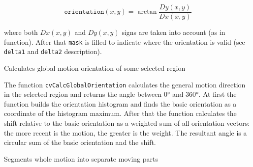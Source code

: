 \[
\texttt{orientation}(x,y)=\arctan{\frac{Dy(x,y)}{Dx(x,y)}}
\]

where both $Dx(x,y)$ and $Dy(x,y)$ signs are taken into account (as in  function). After that \texttt{mask} is filled to indicate where the orientation is valid (see \texttt{delta1} and \texttt{delta2} description).

\label{CalcGlobalOrientation}

Calculates global motion orientation of some selected region


\begin{description}
\end{description}

The function \texttt{cvCalcGlobalOrientation} calculates the general
motion direction in the selected region and returns the angle between
0° and 360°. At first the function builds the orientation histogram
and finds the basic orientation as a coordinate of the histogram
maximum. After that the function calculates the shift relative to the
basic orientation as a weighted sum of all orientation vectors: the more
recent is the motion, the greater is the weight. The resultant angle is
a circular sum of the basic orientation and the shift.

\label{SegmentMotion}

Segments whole motion into separate moving parts

